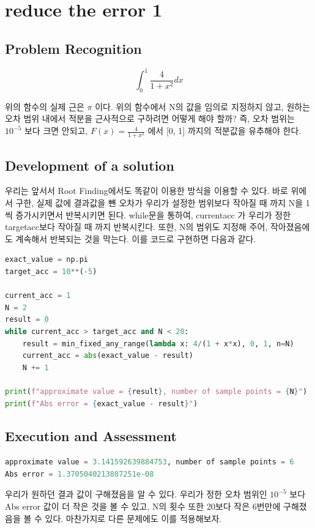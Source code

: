 \documentclass[11pt]{article}
\begin{document}
\section{reduce the error 1}
\subsection{Problem Recognition} 

\begin{equation}
\int_0^1 \frac{4}{1 + x^2} dx
\end{equation}

위의 함수의 실제 근은 $\pi$ 이다. 위의 함수에서 N의 값을 임의로 지정하지 않고, 원하는 오차 범위 내에서 적분을 근사적으로 구하려면 어떻게 해야 할까? 즉, 오차 범위는 $10^{-5}$ 보다 크면 안되고, $F(x) = \frac{4}{1 + x^2} $ 에서 [0, 1] 까지의 적분값을 유추해야 한다. 

\subsection{Development of a solution} 
우리는 앞서서 Root Finding에서도 똑같이 이용한 방식을 이용할 수 있다. 바로 위에서 구한, 실제 값에 결과값을 뺸 오차가 우리가 설정한 범위보다 작아질 때 까지 N을 1씩 증가시키면서 반복시키면 된다.
while문을 통하여, current\textunderscore acc 가 우리가 정한 target\textunderscore acc보다 작아질 때 까지 반복시킨다. 또한, N의 범위도 지정해 주어, 작아졌음에도 계속해서 반복되는 것을 막는다. 이를 코드로 구현하면 다음과 같다.

\begin{lstlisting}[language=Python]
exact_value = np.pi
target_acc = 10**(-5)

current_acc = 1
N = 2
result = 0
while current_acc > target_acc and N < 20:
    result = min_fixed_any_range(lambda x: 4/(1 + x*x), 0, 1, n=N)
    current_acc = abs(exact_value - result)
    N += 1
    
print(f"approximate value = {result}, number of sample points = {N}")
print(f"Abs error = {exact_value - result}")
\end{lstlisting}

\subsection{Execution and Assessment} 

\begin{lstlisting}[language=Python]
approximate value = 3.141592639884753, number of sample points = 6
Abs error = 1.3705040213807251e-08
\end{lstlisting}
우리가 원하던 결과 값이 구해졌음을 알 수 있다. 우리가 정한 오차 범위인 $10^{-5}$ 보다 Abs error 값이 더 작은 것을 볼 수 있고, N의 횟수 또한 20보다 작은 6번만에 구해졌음을 볼 수 있다. 마찬가지로 다른 문제에도 이를 적용해보자.
\end{document}
